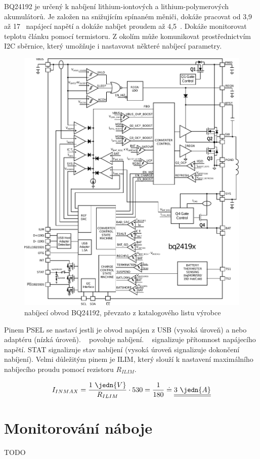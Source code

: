 BQ24192 je určený k nabíjení lithium-iontových a lithium-polymerových akumulátorů. Je založen na snižujícím spínaném měniči, dokáže pracovat od 3,9~ až 17~ napájecí napětí a dokáže nabíjet proudem až 4,5~. Dokáže monitorovat teplotu článku pomocí termistoru. Z okolím může komunikovat prostřednictvím I2C sběrnice, který umožňuje i nastavovat některé nabíjecí parametry.

\begin{figure}[H]
    \begin{center}
        \includegraphics[width=\textwidth]{img/bq24192-block}
    \end{center}
    \caption{nabíjecí obvod BQ24192, převzato z katalogového listu výrobce}
\end{figure}

Pinem PSEL se nastaví jestli je obvod napájen z USB (vysoká úroveň) a nebo adaptéru (nízká úroveň). ~ povoluje nabíjení. ~ signalizuje přítomnost napájecího napětí. STAT signalizuje stav nabíjení (vysoká úroveň signalizuje dokončení nabíjení). Velmi důležitým pinem je ILIM, který slouží k nastavení maximálního nabíjecího proudu pomocí rezistoru $R_{ILIM}$.

$$I_{IN MAX} = \dfrac{1~\jedn{V}}{R_{ILIM}} \cdot 530 = \dfrac{1}{180} \doteq \underline{\underline{3~\jedn{A}}}$$ \nonumber

\section{Monitorování náboje}
TODO
